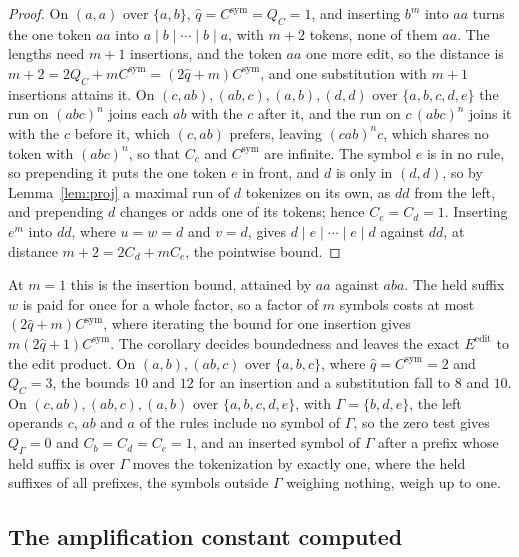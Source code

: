 \documentclass[11pt,a4paper]{article}
\theoremstyle{definition}
\theoremstyle{plain}
\newcommand{\Csym}{C^{\mathrm{sym}}}
\newcommand{\Eedit}{E^{\mathrm{edit}}}
\begin{document}
\begin{proof}
On \((a, a)\) over \(\{a, b\}\), \(\hat{q} = \Csym = Q_C = 1\), and inserting \(b^m\) into \(aa\) turns the one token
\(aa\) into \(a \mid b \mid \cdots \mid b \mid a\), with \(m + 2\) tokens, none of them \(aa\). The lengths need
\(m + 1\) insertions, and the token \(aa\) one more edit, so the distance is
\(m + 2 = 2Q_C + m\Csym = (2\hat{q} + m)\Csym\), and one substitution with \(m + 1\) insertions attains it. On
\((c, ab), (ab, c), (a, b), (d, d)\) over \(\{a, b, c, d, e\}\) the run on \((abc)^n\) joins each \(ab\) with the \(c\)
after it, and the run on \(c\,(abc)^n\) joins it with the \(c\) before it, which \((c, ab)\) prefers, leaving
\((cab)^n c\), which shares no token with \((abc)^n\), so that \(C_c\) and \(\Csym\) are infinite. The symbol \(e\) is
in no rule, so prepending it puts the one token \(e\) in front, and \(d\) is only in \((d, d)\), so by
Lemma~\ref{lem:proj} a maximal run of \(d\) tokenizes on its own, as \(dd\) from the left, and prepending \(d\) changes
or adds one of its tokens; hence \(C_e = C_d = 1\). Inserting \(e^m\) into \(dd\), where \(u = w = d\) and \(v = d\),
gives \(d \mid e \mid \cdots \mid e \mid d\) against \(dd\), at distance \(m + 2 = 2C_d + mC_e\), the pointwise bound.
\end{proof}

At \(m = 1\) this is the insertion bound, attained by \(aa\) against \(aba\). The held suffix \(w\) is paid for once for
a whole factor, so a factor of \(m\) symbols costs at most \((2\hat{q} + m)\Csym\), where iterating the bound for one
insertion gives \(m(2\hat{q} + 1)\Csym\). The corollary decides boundedness and leaves the exact \(\Eedit\) to the edit
product. On \((a, b), (ab, c)\) over \(\{a, b, c\}\), where \(\hat{q} = \Csym = 2\) and \(Q_C = 3\), the bounds \(10\)
and \(12\) for an insertion and a substitution fall to \(8\) and \(10\). On \((c, ab), (ab, c), (a, b)\) over
\(\{a, b, c, d, e\}\), with \(\Gamma = \{b, d, e\}\), the left operands \(c\), \(ab\) and \(a\) of the rules include no
symbol of \(\Gamma\), so the zero test gives \(Q_\Gamma = 0\) and \(C_b = C_d = C_e = 1\), and an inserted symbol of
\(\Gamma\) after a prefix whose held suffix is over \(\Gamma\) moves the tokenization by exactly one, where the held
suffixes of all prefixes, the symbols outside \(\Gamma\) weighing nothing, weigh up to one.

\subsection{The amplification constant computed}\label{sec:ampcomputed}
\end{document}
